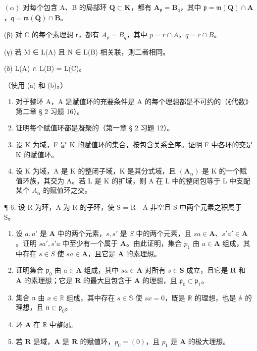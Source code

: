 \((\alpha)\) 对每个包含 A、B 的局部环 \(\mathbf{Q} \subset \mathbf{K}\)，都有 \(\mathbf{A}_{\mathfrak{p}} = \mathbf{B}_{\mathfrak{q}}\)，其中 \(\mathfrak{p} = \mathfrak{m}(\mathbf{Q}) \cap \mathbf{A}\)，\(\mathfrak{q} = \mathfrak{m}(\mathbf{Q}) \cap \mathbf{B}\)。

(β) 对 C 的每个素理想 r，都有 \(A_{p} = B_{q}\)，其中 \(p = r \cap A\)，\(q = r \cap B\)。

(γ) 若 M ∈ L(A) 且 N ∈ L(B) 相关联，则二者相同。

(δ) L(A) ∩ L(B) = L(C)。

（使用 (a) 和 (b)。）

\begin{enumerate}
\def\labelenumi{\arabic{enumi}.}
\setcounter{enumi}{1}
\item
  对于整环 A，A 是赋值环的充要条件是 A 的每个理想都是不可约的（《代数》第二章 § 2 习题 16）。
\item
  证明每个赋值环都是凝聚的（第一章 § 2 习题 12）。
\item
  设 K 为域，F 是 K 的赋值环的集合，按包含关系全序。证明 F 中各环的交是 K 的赋值环。
\item
  设 K 为域，A 是 K 的整闭子域，K 是其分式域，且 \((\mathbf{A}_{\alpha})\) 是 K 的一个赋值环族，其交为 A。若 L 是 K 的扩域，则 A 在 L 中的整闭包等于 L 中支配某个 \(A_{\alpha}\) 的赋值环之交。
\end{enumerate}

¶ 6. 设 R 为环，A 为 R 的子环，使 S = R - A 非空且 S 中两个元素之积属于 S。

\begin{enumerate}
\def\labelenumi{(\alph{enumi})}
\item
  设 \(a, a'\) 是 \(\mathbf{A}\) 中的两个元素，\(s, s'\) 是 \(S\) 中的两个元素，且 \(sa \in \mathbf{A}\)、\(s'a' \in \mathbf{A}\)。证明 \(sa', s'a\) 中至少有一个属于 \(\mathbf{A}\)。由此证明，集合 \(p_1\) 由 \(a \in \mathbf{A}\) 组成，其中存在 \(s \in S\) 使 \(sa \in \mathbf{A}\)，且它是 \(\mathbf{A}\) 的素理想。
\item
  证明集合 \(\mathfrak{p}_0\) 由 \(a \in \mathbf{A}\) 组成，其中 \(sa \in \mathbf{A}\) 对所有 \(s \in \mathbf{S}\) 成立，且它是 \(\mathbf{R}\) 和 \(\mathbf{A}\) 的素理想；它是 \(\mathbf{R}\) 的最大且包含于 \(\mathbf{A}\) 的理想，且 \(\mathfrak{p}_0 \subset \mathfrak{p}_1\)。
\item
  集合 \(\mathfrak{n}\) 由 \(x \in \mathbb{R}\) 组成，其中存在 \(s \in \mathbb{S}\) 使 \(sx = 0\)，既是 \(\mathbb{R}\) 的理想，也是 \(\mathbb{A}\) 的理想，且 \(\mathfrak{n} \subset \mathfrak{p}_0\)。
\item
  环 \(\mathbf{A}\) 在 \(\mathbb{R}\) 中整闭。
\item
  若 \(\mathbf{R}\) 是域，\(\mathbf{A}\) 是 \(\mathbf{R}\) 的赋值环，\(p_0 = (0)\)，且 \(p_1\) 是 \(\mathbf{A}\) 的极大理想。
\end{enumerate}

